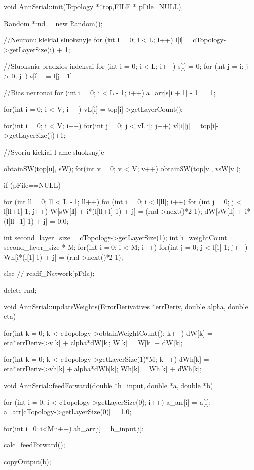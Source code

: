 void AnnSerial::init(Topology **top,FILE * pFile=NULL){

	Random *rnd = new Random();

	//Neuronu kiekiai sluoksnyje
	for (int i = 0; i < L; i++) {
		l[i] = cTopology->getLayerSize(i) + 1;
	}

	//Sluoksniu pradzios indeksai
	for (int i = 0; i < L; i++) {
		s[i] = 0;
		for (int j = i; j > 0; j--) {
			s[i] += l[j - 1];
		}
	}

	//Bias neuronai
	for (int i = 0; i < L - 1; i++) {
		a\_arr[s[i + 1] - 1] = 1;
	}

  for(int i = 0; i < V; i++){
    vL[i] = top[i]->getLayerCount();
  }

  for(int i = 0; i < V; i++)
    for(int j = 0; j < vL[i]; j++)
      vl[i][j] = top[i]->getLayerSize(j)+1;


	//Svoriu kiekiai l-ame sluoksnyje


  obtainSW(top[u], sW);
  for(int v = 0; v < V; v++){
    obtainSW(top[v], vsW[v]);
  }


  if (pFile==NULL) {
    for (int ll = 0; ll < L - 1; ll++)
      for (int i = 0; i < l[ll]; i++)
        for (int j = 0; j < l[ll+1]-1; j++){
          W[sW[ll] + i*(l[ll+1]-1) + j] = (rnd->next()*2-1);
          dW[sW[ll] + i*(l[ll+1]-1) + j] = 0.0;
        }


    int second\_layer\_size = cTopology->getLayerSize(1);
    int h\_weightCount = second\_layer\_size * M;
    for(int i = 0; i < M; i++)
      for(int j = 0; j < l[1]-1; j++)
        Wh[i*(l[1]-1) + j] = (rnd->next()*2-1);

  }
  else {
  //  readf\_Network(pFile);
  }

  delete rnd;

}

void AnnSerial::updateWeights(ErrorDerivatives *errDeriv, double alpha, double eta){

  for(int k = 0; k < cTopology->obtainWeightCount(); k++){
    dW[k] = -eta*errDeriv->v[k] + alpha*dW[k];
    W[k] = W[k] + dW[k];
  }

  for(int k = 0; k < cTopology->getLayerSize(1)*M; k++){
    dWh[k] = -eta*errDeriv->vh[k] + alpha*dWh[k];
    Wh[k] = Wh[k] + dWh[k];
  }

}

void AnnSerial::feedForward(double *h\_input, double *a, double *b){

  for (int i = 0; i < cTopology->getLayerSize(0); i++) {
    a\_arr[i] = a[i];
  }
  a\_arr[cTopology->getLayerSize(0)] = 1.0;

  for(int i=0; i<M;i++){
    ah\_arr[i] = h\_input[i];
  }

	calc\_feedForward();

	copyOutput(b);
}

